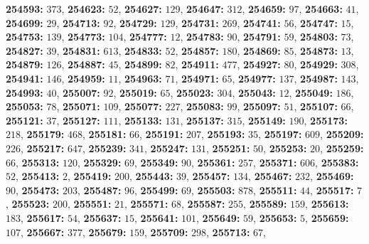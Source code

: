 \textsf{\bfseries 254593:} $373$, \textsf{\bfseries 254623:} $52$, \textsf{\bfseries 254627:} $129$, \textsf{\bfseries 254647:} $312$, \textsf{\bfseries 254659:} $97$, \textsf{\bfseries 254663:} $41$, \textsf{\bfseries 254699:} $29$, \textsf{\bfseries 254713:} $92$, \textsf{\bfseries 254729:} $129$, \textsf{\bfseries 254731:} $269$, \textsf{\bfseries 254741:} $56$, \textsf{\bfseries 254747:} $15$, \textsf{\bfseries 254753:} $139$, \textsf{\bfseries 254773:} $104$, \textsf{\bfseries 254777:} $12$, \textsf{\bfseries 254783:} $90$, \textsf{\bfseries 254791:} $59$, \textsf{\bfseries 254803:} $73$, \textsf{\bfseries 254827:} $39$, \textsf{\bfseries 254831:} $613$, \textsf{\bfseries 254833:} $52$, \textsf{\bfseries 254857:} $180$, \textsf{\bfseries 254869:} $85$, \textsf{\bfseries 254873:} $13$, \textsf{\bfseries 254879:} $126$, \textsf{\bfseries 254887:} $45$, \textsf{\bfseries 254899:} $82$, \textsf{\bfseries 254911:} $477$, \textsf{\bfseries 254927:} $80$, \textsf{\bfseries 254929:} $308$, \textsf{\bfseries 254941:} $146$, \textsf{\bfseries 254959:} $11$, \textsf{\bfseries 254963:} $71$, \textsf{\bfseries 254971:} $65$, \textsf{\bfseries 254977:} $137$, \textsf{\bfseries 254987:} $143$, \textsf{\bfseries 254993:} $40$, \textsf{\bfseries 255007:} $92$, \textsf{\bfseries 255019:} $65$, \textsf{\bfseries 255023:} $304$, \textsf{\bfseries 255043:} $12$, \textsf{\bfseries 255049:} $186$, \textsf{\bfseries 255053:} $78$, \textsf{\bfseries 255071:} $109$, \textsf{\bfseries 255077:} $227$, \textsf{\bfseries 255083:} $99$, \textsf{\bfseries 255097:} $51$, \textsf{\bfseries 255107:} $66$, \textsf{\bfseries 255121:} $37$, \textsf{\bfseries 255127:} $111$, \textsf{\bfseries 255133:} $131$, \textsf{\bfseries 255137:} $315$, \textsf{\bfseries 255149:} $190$, \textsf{\bfseries 255173:} $218$, \textsf{\bfseries 255179:} $468$, \textsf{\bfseries 255181:} $66$, \textsf{\bfseries 255191:} $207$, \textsf{\bfseries 255193:} $35$, \textsf{\bfseries 255197:} $609$, \textsf{\bfseries 255209:} $226$, \textsf{\bfseries 255217:} $647$, \textsf{\bfseries 255239:} $341$, \textsf{\bfseries 255247:} $131$, \textsf{\bfseries 255251:} $50$, \textsf{\bfseries 255253:} $20$, \textsf{\bfseries 255259:} $66$, \textsf{\bfseries 255313:} $120$, \textsf{\bfseries 255329:} $69$, \textsf{\bfseries 255349:} $90$, \textsf{\bfseries 255361:} $257$, \textsf{\bfseries 255371:} $606$, \textsf{\bfseries 255383:} $52$, \textsf{\bfseries 255413:} $2$, \textsf{\bfseries 255419:} $200$, \textsf{\bfseries 255443:} $39$, \textsf{\bfseries 255457:} $134$, \textsf{\bfseries 255467:} $232$, \textsf{\bfseries 255469:} $90$, \textsf{\bfseries 255473:} $203$, \textsf{\bfseries 255487:} $96$, \textsf{\bfseries 255499:} $69$, \textsf{\bfseries 255503:} $878$, \textsf{\bfseries 255511:} $44$, \textsf{\bfseries 255517:} $7$, \textsf{\bfseries 255523:} $200$, \textsf{\bfseries 255551:} $21$, \textsf{\bfseries 255571:} $68$, \textsf{\bfseries 255587:} $255$, \textsf{\bfseries 255589:} $159$, \textsf{\bfseries 255613:} $183$, \textsf{\bfseries 255617:} $54$, \textsf{\bfseries 255637:} $15$, \textsf{\bfseries 255641:} $101$, \textsf{\bfseries 255649:} $59$, \textsf{\bfseries 255653:} $5$, \textsf{\bfseries 255659:} $107$, \textsf{\bfseries 255667:} $377$, \textsf{\bfseries 255679:} $159$, \textsf{\bfseries 255709:} $298$, \textsf{\bfseries 255713:} $67$, 
